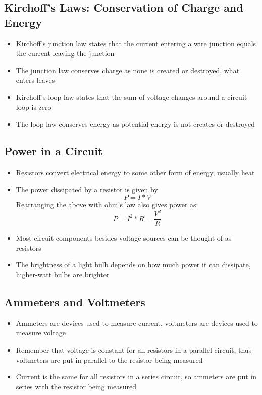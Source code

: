 \subsection{Kirchoff's Laws: Conservation of Charge and Energy}
\begin{itemize}
    \item Kirchoff's junction law states that the current entering a wire junction equals the current leaving the junction
    \item The junction law conserves charge as none is created or destroyed, what enters leaves
    \item Kirchoff's loop law states that the sum of voltage changes around a circuit loop is zero
    \item The loop law conserves energy as potential energy is not creates or destroyed
\end{itemize}

\subsection{Power in a Circuit}
\begin{itemize}
    \item Resistors convert electrical energy to some other form of energy, usually heat
    \item The power dissipated by a resistor is given by \[P=I*V\] Rearranging the above with ohm's law also gives power as: \[P=I^2*R=\frac{V^2}{R}\]
    \item Most circuit components besides voltage sources can be thought of as resistors
    \item The brightness of a light bulb depends on how much power it can dissipate, higher-watt bulbs are brighter
\end{itemize}

\subsection{Ammeters and Voltmeters}
\begin{itemize}
    \item Ammeters are devices used to measure current, voltmeters are devices used to measure voltage
    \item Remember that voltage is constant for all resistors in a parallel circuit, thus voltmeters are put in parallel to the resistor being measured
    \item Current is the same for all resistors in a series circuit, so ammeters are put in series with the resistor being measured
\end{itemize}